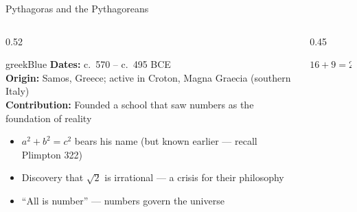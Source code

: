 \begin{frame}[shrink=8]{Pythagoras and the Pythagoreans}

  \begin{columns}[T]
    \begin{column}{0.52\textwidth}
      \begin{personbox}{greekBlue}
        \small
        \textbf{Dates:} c.\ 570 -- c.\ 495 BCE\\
        \textbf{Origin:} Samos, Greece; active in Croton, Magna Graecia (southern Italy)\\
        \textbf{Contribution:} Founded a school that saw numbers as the
        foundation of reality
      \end{personbox}

      \vspace{0.3em}
      \begin{itemize}
        \item $a^2 + b^2 = c^2$ bears his name (but known earlier --- recall Plimpton 322)
        \item Discovery that $\sqrt{2}$ is \alert{irrational} --- a crisis for their philosophy
        \item ``All is number'' --- numbers govern the universe
      \end{itemize}
    \end{column}

    \begin{column}{0.45\textwidth}

      \vspace{0.3em}
      {\small\centering $16 + 9 = 25$ \quad\checkmark}
    \end{column}
  \end{columns}

\end{frame}

